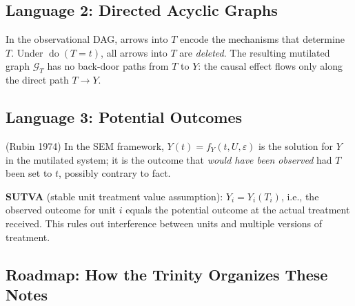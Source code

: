 \documentclass[
  a4paper,
]{book}
\newcommand{\doop}{\operatorname{do}}
\newcommand{\Gcal}{\mathcal{G}}
\begin{document}
\subsection{Language 2: Directed Acyclic
Graphs}\label{language-2-directed-acyclic-graphs}

\begin{tcolorbox}[enhanced jigsaw, arc=.35mm, bottomrule=.15mm, bottomtitle=1mm, breakable, colback=white, colbacktitle=quarto-callout-note-color!10!white, colframe=quarto-callout-note-color-frame, coltitle=black, left=2mm, leftrule=.75mm, opacityback=0, opacitybacktitle=0.6, rightrule=.15mm, title={Definition: Graph Surgery}, titlerule=0mm, toprule=.15mm, toptitle=1mm]

In the observational DAG, arrows into \(T\) encode the mechanisms that
determine \(T\). Under \(\doop(T{=}t)\), all arrows into \(T\) are
\emph{deleted}. The resulting mutilated graph \(\Gcal_T\) has no
back-door paths from \(T\) to \(Y\): the causal effect flows only along
the direct path \(T \to Y\).

\end{tcolorbox}

\subsection{Language 3: Potential
Outcomes}\label{language-3-potential-outcomes}

\begin{tcolorbox}[enhanced jigsaw, arc=.35mm, bottomrule=.15mm, bottomtitle=1mm, breakable, colback=white, colbacktitle=quarto-callout-note-color!10!white, colframe=quarto-callout-note-color-frame, coltitle=black, left=2mm, leftrule=.75mm, opacityback=0, opacitybacktitle=0.6, rightrule=.15mm, title={Definition: Potential Outcome}, titlerule=0mm, toprule=.15mm, toptitle=1mm]

(Rubin 1974) In the SEM framework, \(Y(t) = f_Y(t, U, \varepsilon)\) is
the solution for \(Y\) in the mutilated system; it is the outcome that
\emph{would have been observed} had \(T\) been set to \(t\), possibly
contrary to fact.

\textbf{SUTVA} (stable unit treatment value assumption):
\(Y_i = Y_i(T_i)\), i.e., the observed outcome for unit \(i\) equals the
potential outcome at the actual treatment received. This rules out
interference between units and multiple versions of treatment.

\end{tcolorbox}

\subsection{Roadmap: How the Trinity Organizes These
Notes}\label{roadmap-how-the-trinity-organizes-these-notes}
\end{document}

